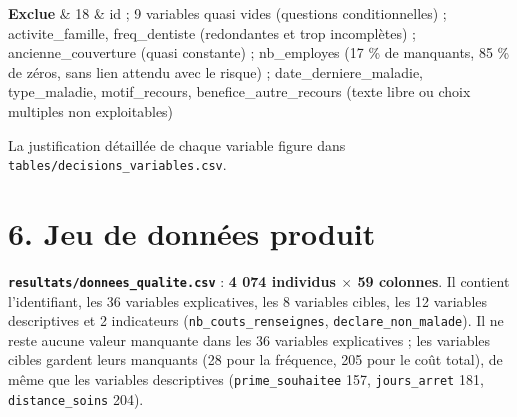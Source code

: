 \documentclass[

  french,

  10pt,

  a4paper,

]{article}
\begin{document}
{\begin{longtable}[]
\textbf{Exclue} & 18 & id ; 9 variables quasi vides (questions conditionnelles) ; activite\_famille, freq\_dentiste (redondantes et trop incomplètes) ; ancienne\_couverture (quasi constante) ; nb\_employes (17 \% de manquants, 85 \% de zéros, sans lien attendu avec le risque) ; date\_derniere\_maladie, type\_maladie, motif\_recours, benefice\_autre\_recours (texte libre ou choix multiples non exploitables) \\

\end{longtable}

}



La justification détaillée de chaque variable figure dans \texttt{tables/decisions\_variables.csv}.



\section{6. Jeu de données produit}



\textbf{\texttt{resultats/donnees\_qualite.csv}} : \textbf{4 074 individus \ensuremath{\times} 59 colonnes}. Il contient l'identifiant, les 36 variables explicatives, les 8 variables cibles, les 12 variables descriptives et 2 indicateurs (\texttt{nb\_couts\_renseignes}, \texttt{declare\_non\_malade}). Il ne reste aucune valeur manquante dans les 36 variables explicatives ; les variables cibles gardent leurs manquants (28 pour la fréquence, 205 pour le coût total), de même que les variables descriptives (\texttt{prime\_souhaitee} 157, \texttt{jours\_arret} 181, \texttt{distance\_soins} 204).
\end{document}
